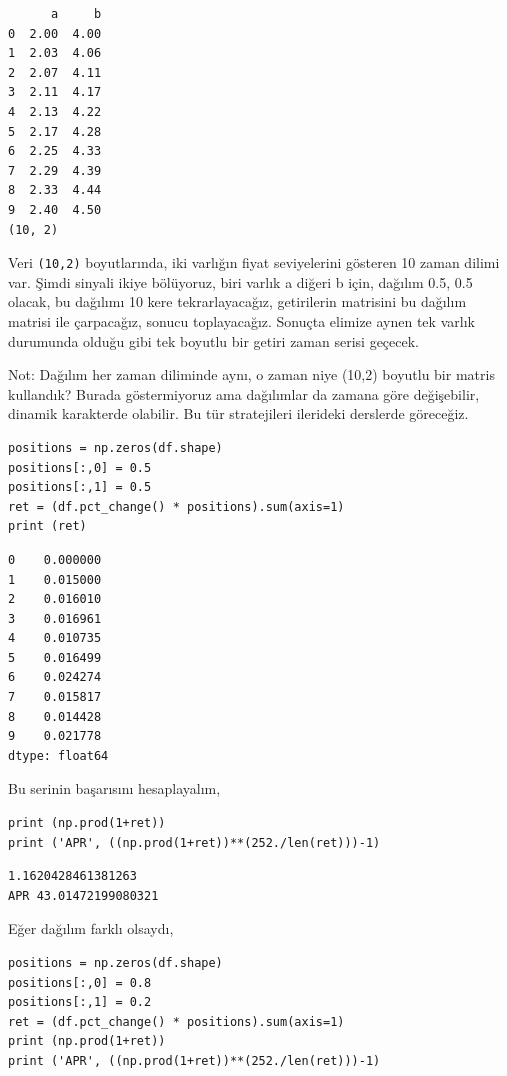 \documentclass[12pt,fleqn]{article}\usepackage{../../common}
\begin{document}
\begin{verbatim}
      a     b
0  2.00  4.00
1  2.03  4.06
2  2.07  4.11
3  2.11  4.17
4  2.13  4.22
5  2.17  4.28
6  2.25  4.33
7  2.29  4.39
8  2.33  4.44
9  2.40  4.50
(10, 2)
\end{verbatim}

Veri \verb!(10,2)! boyutlarında, iki varlığın fiyat seviyelerini gösteren 10
zaman dilimi var. Şimdi sinyali ikiye bölüyoruz, biri varlık a diğeri b için,
dağılım 0.5, 0.5 olacak, bu dağılımı 10 kere tekrarlayacağız, getirilerin
matrisini bu dağılım matrisi ile çarpacağız, sonucu toplayacağız.  Sonuçta
elimize aynen tek varlık durumunda olduğu gibi tek boyutlu bir getiri zaman
serisi geçecek.

Not: Dağılım her zaman diliminde aynı, o zaman niye (10,2) boyutlu bir matris
kullandık? Burada göstermiyoruz ama dağılımlar da zamana göre değişebilir,
dinamik karakterde olabilir. Bu tür stratejileri ilerideki derslerde göreceğiz.

\begin{verbatim}
positions = np.zeros(df.shape)
positions[:,0] = 0.5
positions[:,1] = 0.5
ret = (df.pct_change() * positions).sum(axis=1)
print (ret)
\end{verbatim}

\begin{verbatim}
0    0.000000
1    0.015000
2    0.016010
3    0.016961
4    0.010735
5    0.016499
6    0.024274
7    0.015817
8    0.014428
9    0.021778
dtype: float64
\end{verbatim}

Bu serinin başarısını hesaplayalım,

\begin{verbatim}
print (np.prod(1+ret))
print ('APR', ((np.prod(1+ret))**(252./len(ret)))-1)
\end{verbatim}

\begin{verbatim}
1.1620428461381263
APR 43.01472199080321
\end{verbatim}

Eğer dağılım farklı olsaydı, 

\begin{verbatim}
positions = np.zeros(df.shape)
positions[:,0] = 0.8
positions[:,1] = 0.2
ret = (df.pct_change() * positions).sum(axis=1)
print (np.prod(1+ret))
print ('APR', ((np.prod(1+ret))**(252./len(ret)))-1)
\end{verbatim}
\end{document}
